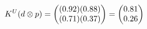\documentclass[preview]{standalone}
\begin{document}
\begin{align*}
\special{dvisvgm:raw <g id='unique000'>}K^U(d \otimes p) = \begin{pmatrix} (0.92)(0.88) \\ (0.71)(0.37) \end{pmatrix} = \begin{pmatrix} 0.81 \\ 0.26 \end{pmatrix}\special{dvisvgm:raw </g>}
\end{align*}
\end{document}
